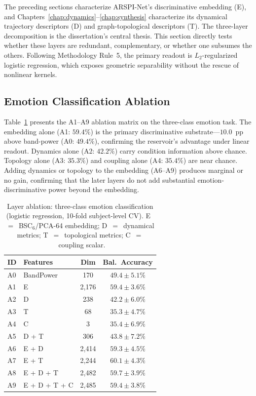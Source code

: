 The preceding sections characterize ARSPI-Net's discriminative embedding (E), and Chapters~\ref{chap:dynamics}--\ref{chap:synthesis} characterize its dynamical trajectory descriptors (D) and graph-topological descriptors (T). The three-layer decomposition is the dissertation's central thesis. This section directly tests whether these layers are redundant, complementary, or whether one subsumes the others. Following Methodology Rule~5, the primary readout is $L_2$-regularized logistic regression, which exposes geometric separability without the rescue of nonlinear kernels.

\subsection{Emotion Classification Ablation}

Table~\ref{tab:emotion_ablation} presents the A1--A9 ablation matrix on the three-class emotion task. The embedding alone (A1: $59.4\%$) is the primary discriminative substrate---$10.0$~pp above band-power (A0: $49.4\%$), confirming the reservoir's advantage under linear readout. Dynamics alone (A2: $42.2\%$) carry condition information above chance. Topology alone (A3: $35.3\%$) and coupling alone (A4: $35.4\%$) are near chance. Adding dynamics or topology to the embedding (A6--A9) produces marginal or no gain, confirming that the later layers do not add substantial emotion-discriminative power beyond the embedding.

\begin{table}[t]
\centering
\caption{Layer ablation: three-class emotion classification (logistic regression, 10-fold subject-level CV). E~$=$~BSC$_6$/PCA-64 embedding; D~$=$~dynamical metrics; T~$=$~topological metrics; C~$=$~coupling scalar.}
\label{tab:emotion_ablation}
\small
\begin{tabular}{llcc}
\hline
\textbf{ID} & \textbf{Features} & \textbf{Dim} & \textbf{Bal.\ Accuracy} \\
\hline
A0 & BandPower & 170 & $49.4 \pm 5.1\%$ \\
A1 & E & 2,176 & $59.4 \pm 3.6\%$ \\
A2 & D & 238 & $42.2 \pm 6.0\%$ \\
A3 & T & 68 & $35.3 \pm 4.7\%$ \\
A4 & C & 3 & $35.4 \pm 6.9\%$ \\
A5 & D + T & 306 & $43.8 \pm 7.2\%$ \\
A6 & E + D & 2,414 & $59.3 \pm 4.5\%$ \\
A7 & E + T & 2,244 & $60.1 \pm 4.3\%$ \\
A8 & E + D + T & 2,482 & $59.7 \pm 3.9\%$ \\
A9 & E + D + T + C & 2,485 & $59.4 \pm 3.8\%$ \\
\hline
\end{tabular}
\end{table}

